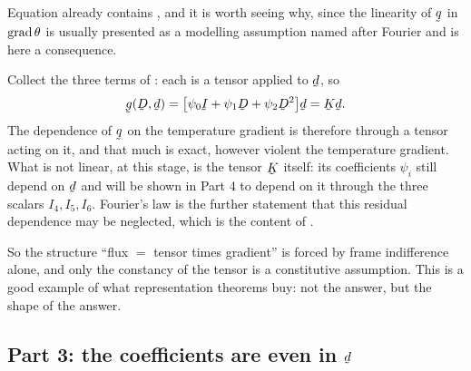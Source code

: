 \begin{remark}\label{rem:ch9linq}
Equation  already contains , and it is worth seeing
why, since the linearity of $\bq$ in $\operatorname{grad}\theta$ is usually presented
as a modelling assumption named after Fourier and is here a consequence.

Collect the three terms of : each is a tensor applied to
$\bd$, so
\[
   \bg(\bD,\bd)=\big[\psi_{0}\I+\psi_{1}\bD+\psi_{2}\bD^{2}\big]\bd
   =\bK\bd .
\]
The dependence of $\bq$ on the temperature gradient is therefore
through a tensor acting on it, and that much is exact, however
violent the temperature gradient. What is not linear, at this stage, is
the tensor $\bK$ itself: its coefficients $\psi_{i}$ still depend on
$\bd$ and will be shown in Part 4 to depend on it through the three
scalars $I_{4},I_{5},I_{6}$. Fourier's law is the further statement that
this residual dependence may be neglected, which is the content of
.

So the structure ``flux $=$ tensor times gradient'' is forced by frame
indifference alone, and only the constancy of the tensor is a
constitutive assumption. This is a good example of what representation
theorems buy: not the answer, but the shape of the answer.
\end{remark}

\subsection*{Part 3: the coefficients are even in $\bd$}

